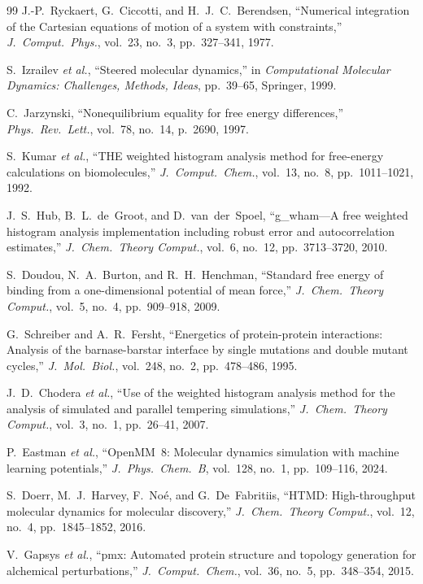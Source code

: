 \documentclass[conference]{IEEEtran}
\begin{document}
\begin{thebibliography}{99}
J.-P.~Ryckaert, G.~Ciccotti, and H.~J.~C.~Berendsen,
``Numerical integration of the Cartesian equations of motion of a system
with constraints,''
\textit{J.\ Comput.\ Phys.}, vol.~23, no.~3, pp.~327--341, 1977.

S.~Izrailev \textit{et al.},
``Steered molecular dynamics,'' in \textit{Computational Molecular
Dynamics: Challenges, Methods, Ideas}, pp.~39--65, Springer, 1999.

C.~Jarzynski,
``Nonequilibrium equality for free energy differences,''
\textit{Phys.\ Rev.\ Lett.}, vol.~78, no.~14, p.~2690, 1997.

S.~Kumar \textit{et al.},
``THE weighted histogram analysis method for free-energy calculations on
biomolecules,''
\textit{J.\ Comput.\ Chem.}, vol.~13, no.~8, pp.~1011--1021, 1992.

J.~S.~Hub, B.~L.~de~Groot, and D.~van~der~Spoel,
``g\_wham---A free weighted histogram analysis implementation including
robust error and autocorrelation estimates,''
\textit{J.\ Chem.\ Theory Comput.}, vol.~6, no.~12, pp.~3713--3720, 2010.

S.~Doudou, N.~A.~Burton, and R.~H.~Henchman,
``Standard free energy of binding from a one-dimensional potential of mean
force,''
\textit{J.\ Chem.\ Theory Comput.}, vol.~5, no.~4, pp.~909--918, 2009.

G.~Schreiber and A.~R.~Fersht,
``Energetics of protein-protein interactions: Analysis of the
barnase-barstar interface by single mutations and double mutant cycles,''
\textit{J.\ Mol.\ Biol.}, vol.~248, no.~2, pp.~478--486, 1995.

J.~D.~Chodera \textit{et al.},
``Use of the weighted histogram analysis method for the analysis of
simulated and parallel tempering simulations,''
\textit{J.\ Chem.\ Theory Comput.}, vol.~3, no.~1, pp.~26--41, 2007.

P.~Eastman \textit{et al.},
``OpenMM~8: Molecular dynamics simulation with machine learning
potentials,''
\textit{J.\ Phys.\ Chem.\ B}, vol.~128, no.~1, pp.~109--116, 2024.

S.~Doerr, M.~J.~Harvey, F.~No{\'e}, and G.~De~Fabritiis,
``HTMD: High-throughput molecular dynamics for molecular discovery,''
\textit{J.\ Chem.\ Theory Comput.}, vol.~12, no.~4, pp.~1845--1852, 2016.

V.~Gapsys \textit{et al.},
``pmx: Automated protein structure and topology generation for alchemical
perturbations,''
\textit{J.\ Comput.\ Chem.}, vol.~36, no.~5, pp.~348--354, 2015.


\end{thebibliography}
\end{document}
